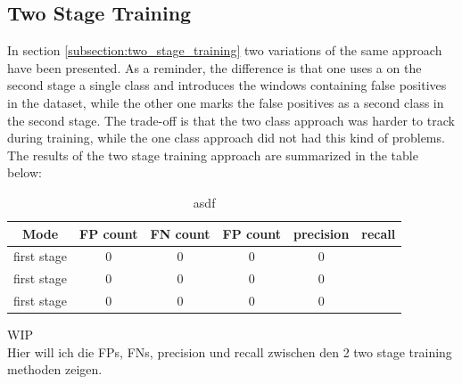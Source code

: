 \subsection*{Two Stage Training}
In section \ref{subsection:two_stage_training} two variations of the same approach have been presented. As a reminder, the difference is that one uses a on the second stage a single class and introduces the windows containing false positives in the dataset, while the other one marks the false positives as a second class in the second stage. The trade-off is that the two class approach was harder to track during training, while the one class approach did not had this kind of problems.
The results of the two stage training approach are summarized in the table below: \\
\begin{table}
  \centering
    \begin{tabular}{||c|c|c|c|c|c||}
    \hline
    Mode & FP count & FN count & FP count & precision & recall\\ [0.5ex]
    \hline\hline
    first stage & 0 & 0 & 0 & 0 \\
    first stage & 0 & 0 & 0 & 0 \\
    first stage & 0 & 0 & 0 & 0 \\
    \hline
    \end{tabular}
  \caption{asdf}
  \label{impl:two_stage_table}
\end{table}

WIP \\
Hier will ich die FPs, FNs, precision und recall zwischen den 2 two stage training methoden zeigen. \\

